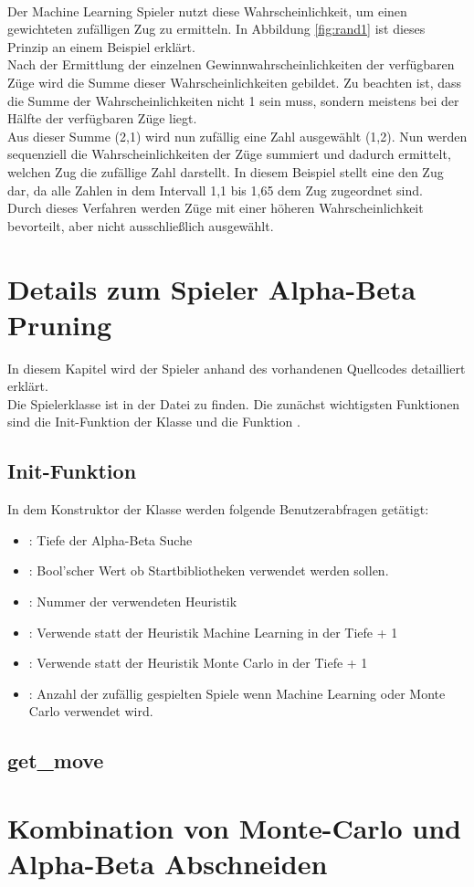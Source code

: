 \\Der Machine Learning Spieler nutzt diese Wahrscheinlichkeit, um einen gewichteten zufälligen Zug zu ermitteln.
In Abbildung \ref{fig:rand1} ist dieses Prinzip an einem Beispiel erklärt.
\\
Nach der Ermittlung der einzelnen Gewinnwahrscheinlichkeiten der verfügbaren Züge wird die Summe dieser Wahrscheinlichkeiten gebildet. Zu beachten ist, dass die Summe der Wahrscheinlichkeiten nicht 1 sein muss, sondern meistens bei der Hälfte der verfügbaren Züge liegt.
\\Aus dieser Summe (2,1) wird nun zufällig eine Zahl ausgewählt (1,2). Nun werden sequenziell die Wahrscheinlichkeiten der Züge summiert und dadurch ermittelt, welchen Zug die zufällige Zahl darstellt. In diesem Beispiel stellt eine  den Zug  dar, da alle Zahlen in dem Intervall 1,1 bis 1,65 dem Zug  zugeordnet sind.
\\Durch dieses Verfahren werden Züge mit einer höheren Wahrscheinlichkeit bevorteilt, aber nicht ausschließlich ausgewählt.  

\section{Details zum Spieler Alpha-Beta Pruning}
In diesem Kapitel wird der Spieler  anhand des vorhandenen Quellcodes detailliert erklärt.
\\Die Spielerklasse  ist in der Datei  zu finden.
Die zunächst wichtigsten Funktionen sind die Init-Funktion der Klasse und die Funktion .
\subsection{Init-Funktion}
In dem Konstruktor der Klasse  werden folgende Benutzerabfragen getätigt:
\begin{itemize}
\item {}: Tiefe der Alpha-Beta Suche
\item {}: Bool'scher Wert ob Startbibliotheken verwendet werden sollen.
\item {}: Nummer der verwendeten Heuristik
\item {}: Verwende statt der Heuristik Machine Learning in der Tiefe  + 1
\item {}: Verwende statt der Heuristik Monte Carlo in der Tiefe  + 1
\item {}: Anzahl der zufällig gespielten Spiele wenn Machine Learning oder Monte Carlo verwendet wird.
\end{itemize}

\subsection{get\_move}
\section{Kombination von Monte-Carlo und Alpha-Beta Abschneiden}
\label{ab_comb}